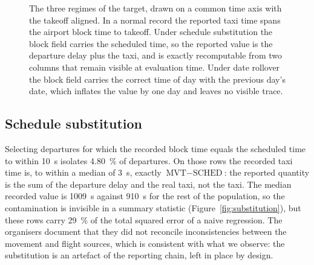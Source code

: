 \documentclass[11pt,a4paper]{article}
\begin{document}
\begin{figure}[t]
\caption{The three regimes of the target, drawn on a common time axis with the
takeoff aligned. In a normal record the reported taxi time spans the airport
block time to takeoff. Under schedule substitution the block field carries the
scheduled time, so the reported value is the departure delay plus the taxi, and
is exactly recomputable from two columns that remain visible at evaluation
time. Under date rollover the block field carries the correct time of day with
the previous day's date, which inflates the value by one day and leaves no
visible trace.}
\label{fig:regimes}
\end{figure}


\subsection{Schedule substitution}

Selecting departures for which the recorded block time equals the scheduled
time to within \SI{10}{\second} isolates \SI{4.80}{\percent} of departures. On
those rows the recorded taxi time is, to within a median of \SI{3}{\second},
exactly \(\text{MVT} - \text{SCHED}\): the reported quantity is the sum of the
departure delay and the real taxi, not the taxi. The median recorded value is
\SI{1009}{\second} against \SI{910}{\second} for the rest of the population,
so the contamination is invisible in a summary statistic
(Figure~\ref{fig:substitution}), but these rows carry \SI{29}{\percent} of the
total squared error of a naive regression. The organisers document that they
did not reconcile inconsistencies between the movement and flight sources,
which is consistent with what we observe: the substitution is an artefact of
the reporting chain, left in place by design.
\end{document}
